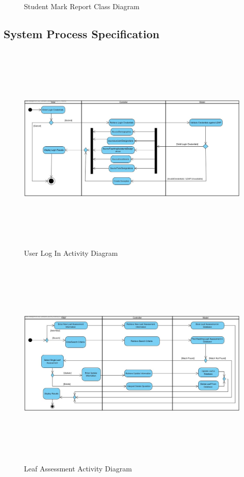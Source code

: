 \documentclass[12pt]{article}
\begin{document}
\begin{itemize}
\begin{figure}[h]
                                                \caption{Student Mark Report Class Diagram}
					\end{figure}
                     \FloatBarrier
                                \end{itemize}
						
				\vspace{0.2in}
		
		\subsection{System Process Specification}%
						\begin{figure}[h]
										\centering
										\includegraphics[width=6in, height=4in]{Pictures/LoginActivityDiagram.jpg}
										\caption{User Log In Activity Diagram}
						\end{figure}
						\FloatBarrier
						\begin{figure}[h]
										\centering
										\includegraphics[width=6in, height=4in]{Pictures/LeafAssesmentActivityDiagram.jpg}
										\caption{Leaf Assessment Activity Diagram}
						\end{figure}
\end{document}
